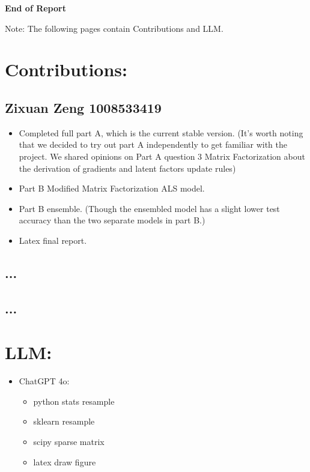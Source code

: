 \documentclass{article}
\begin{document}
\vspace*{5cm}
\begin{center}
\Large\bfseries End of Report
\end{center}
Note: The following pages contain Contributions and LLM.


\newpage
\section*{Contributions:}
\subsection*{Zixuan Zeng 1008533419}
\begin{itemize}
    \item Completed full part A, which is the current stable version.\newline
    (It's worth noting that we decided to try out part A independently to get familiar with the project. We shared opinions on Part A question 3 Matrix Factorization about the derivation of gradients and latent factors update rules)
    \item Part B Modified Matrix Factorization ALS model.
    \item Part B ensemble.\newline
    (Though the ensembled model has a slight lower test accuracy than the two separate models in part B.)
    \item Latex final report.
\end{itemize}
\subsection*{...}
\subsection*{...}

\newpage
\section*{LLM:}
\begin{itemize}
    \item ChatGPT 4o:
    \begin{itemize}
        \item python stats resample
        \item sklearn resample
        \item scipy sparse matrix
        \item latex draw figure
    \end{itemize}
\end{itemize}
\end{document}
